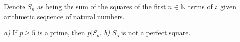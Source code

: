 Denote $ S_n $ as being the sum of the squares of the first $ n\in\mathbb{N} $ terms of a given arithmetic sequence of natural numbers.

\textit{a)} If $ p\ge 5 $ is a prime, then $ p\big| S_p. $
\textit{b)} $ S_5 $ is not a perfect square.